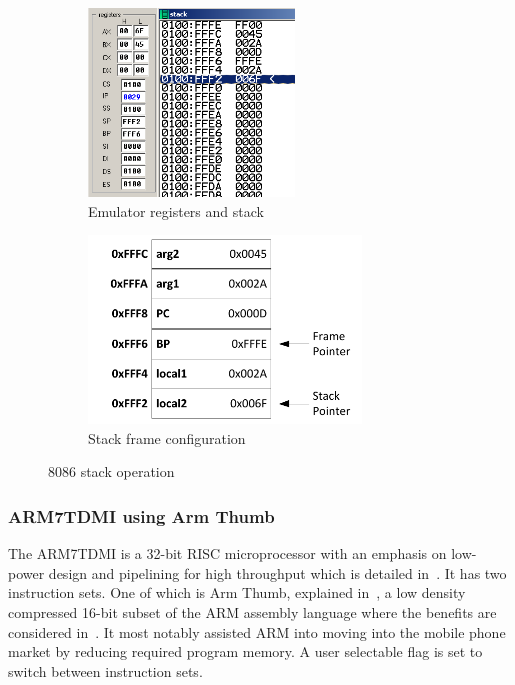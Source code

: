\documentclass[12pt,a4paper]{article}
\begin{document}
\begin{figure}[htb]
        \centering
        \begin{subfigure}[b]{0.5\textwidth}
                \includegraphics[height=5cm]{Figures/emu.png}
                \caption{Emulator registers and stack}
                \label{fig:emu}
        \end{subfigure}%
        \begin{subfigure}[b]{0.5\textwidth}
                \includegraphics[height=5cm]{Figures/stack.pdf}
                \caption{Stack frame configuration}
                \label{fig:stack}
        \end{subfigure}
        \caption{8086 stack operation}
        \label{fig:8086}
\end{figure}







\subsubsection{ARM7TDMI using Arm Thumb}
The ARM7TDMI is a 32-bit RISC microprocessor with an emphasis on low-power design and pipelining for high throughput which is detailed in~\cite{ARM7TDMI}.
It has two instruction sets. 
One of which is Arm Thumb, explained in~\cite{arm}, a low density compressed 16-bit subset of the ARM assembly language where the benefits are considered in~\cite{ARMs}.
It most notably assisted ARM into moving into the mobile phone market by reducing required program memory. 
A user selectable flag is set to switch between instruction sets.
\end{document}
